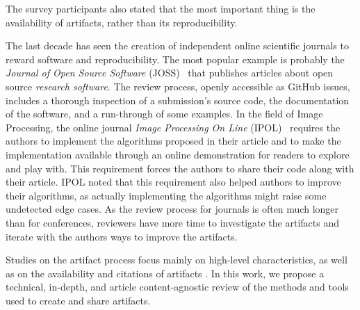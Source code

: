\documentclass[sigconf,natbib=false]{acmart}
\newcommand{\ad}{Artifact Description}
\newcommand{\aeval}{Artifact Evaluation}
\newcommand{\adae}{\ad/\aeval}
\newcommand{\todo}[1]{{\color{red}{TODO: #1}}}
\begin{document}
The survey participants \cite{hermann2020community} also stated that the most important thing is the availability of artifacts, rather than its reproducibility.

The last decade has seen the creation of independent online scientific journals to reward software and reproducibility.
The most popular example is probably the \emph{Journal of Open Source Software} (JOSS)\ \cite{smith2018journal} that publishes articles about open source \emph{research software}.
The review process, openly accessible as GitHub issues, includes a thorough inspection of a submission's source code, the documentation of the software, and a run-through of some examples.
In the field of Image Processing, the online journal \emph{Image Processing On Line} (IPOL)\ \cite{colom2015ipol} requires the authors to implement the algorithms proposed in their article and to make the implementation available through an online demonstration for readers to explore and play with.
This requirement forces the authors to share their code along with their article.
IPOL noted that this requirement also helped authors to improve their algorithms, as actually implementing the algorithms might raise some undetected edge cases.
As the review process for journals is often much longer than for conferences, reviewers have more time to investigate the artifacts and iterate with the authors ways to improve the artifacts.



Studies on the artifact process focus mainly on high-level characteristics, as well as on the availability and citations of artifacts \cite{kidwell2016badges, rowhani2017incentives, winter2022retrospective, frachtenberg2022research, heumuller2020publish}. 
In this work, we propose a technical, in-depth, and article content-agnostic review of the methods and tools used to create and share artifacts.


%
%
\end{document}
